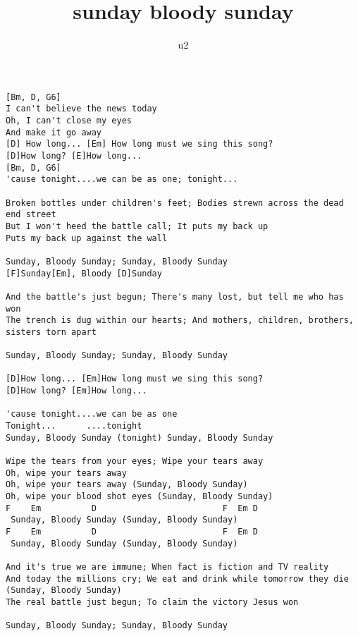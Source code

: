 \author{u2}
\title{sunday bloody sunday}
\maketitle
\begin{verbatim}
[Bm, D, G6]
I can't believe the news today 
Oh, I can't close my eyes 
And make it go away 
[D] How long... [Em] How long must we sing this song? 
[D]How long? [E]How long... 
[Bm, D, G6]
'cause tonight....we can be as one; tonight... 

Broken bottles under children's feet; Bodies strewn across the dead end street 
But I won't heed the battle call; It puts my back up 
Puts my back up against the wall

Sunday, Bloody Sunday; Sunday, Bloody Sunday
[F]Sunday[Em], Bloody [D]Sunday

And the battle's just begun; There's many lost, but tell me who has won 
The trench is dug within our hearts; And mothers, children, brothers, sisters torn apart 

Sunday, Bloody Sunday; Sunday, Bloody Sunday 
  
[D]How long... [Em]How long must we sing this song? 
[D]How long? [Em]How long... 

'cause tonight....we can be as one 
Tonight...      ....tonight 
Sunday, Bloody Sunday (tonight) Sunday, Bloody Sunday 

Wipe the tears from your eyes; Wipe your tears away 
Oh, wipe your tears away
Oh, wipe your tears away (Sunday, Bloody Sunday)
Oh, wipe your blood shot eyes (Sunday, Bloody Sunday) 
F    Em          D                         F  Em D 
 Sunday, Bloody Sunday (Sunday, Bloody Sunday) 
F    Em          D                         F  Em D 
 Sunday, Bloody Sunday (Sunday, Bloody Sunday) 

And it's true we are immune; When fact is fiction and TV reality 
And today the millions cry; We eat and drink while tomorrow they die 
(Sunday, Bloody Sunday)
The real battle just begun; To claim the victory Jesus won 

Sunday, Bloody Sunday; Sunday, Bloody Sunday 
\end{verbatim}